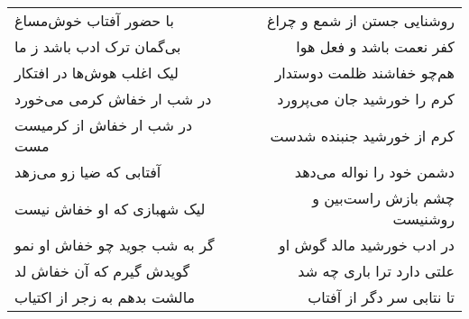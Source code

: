 \begin{center}
\begin{longtable}{l p{0.5cm} r}
\\
با حضور آفتاب خوش‌مساغ
&&
روشنایی جستن از شمع و چراغ
\\
بی‌گمان ترک ادب باشد ز ما
&&
کفر نعمت باشد و فعل هوا
\\
لیک اغلب هوش‌ها در افتکار
&&
هم‌چو خفاشند ظلمت دوستدار
\\
در شب ار خفاش کرمی می‌خورد
&&
کرم را خورشید جان می‌پرورد
\\
در شب ار خفاش از کرمیست مست
&&
کرم از خورشید جنبنده شدست
\\
آفتابی که ضیا زو می‌زهد
&&
دشمن خود را نواله می‌دهد
\\
لیک شهبازی که او خفاش نیست
&&
چشم بازش راست‌بین و روشنیست
\\
گر به شب جوید چو خفاش او نمو
&&
در ادب خورشید مالد گوش او
\\
گویدش گیرم که آن خفاش لد
&&
علتی دارد ترا باری چه شد
\\
مالشت بدهم به زجر از اکتیاب
&&
تا نتابی سر دگر از آفتاب
\\
\end{longtable}
\end{center}
